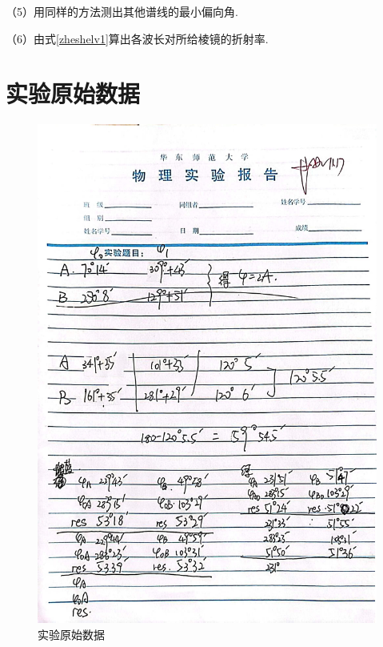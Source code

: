\documentclass{ctexart}
\begin{document}
    （5）用同样的方法测出其他谱线的最小偏向角.

    （6）由式\ref{zheshelv1}算出各波长对所给棱镜的折射率.
\newpage

\section{实验原始数据}
\begin{figure}[H]
  \centering
  \includegraphics[height=0.8\textheight,width=1\textwidth]{yuanshishujv.jpg}
  \caption{实验原始数据}\label{yuanshishujv}
\end{figure}
\newpage
\end{document}
